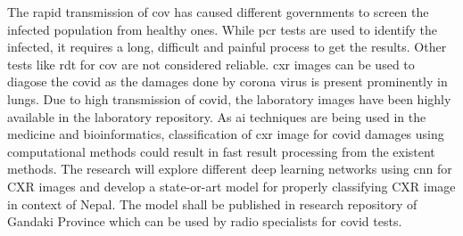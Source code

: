 The rapid transmission of \acrlong{cov} has caused different governments to screen the infected population from healthy ones. While \acrfull{pcr} tests are used to identify the infected, it requires a long, difficult and painful process to get the results. Other tests like \acrfull{rdt} for \acrlong{cov} are not considered reliable. 
\acrfull{cxr} images can be used to diagose the \acrlong{covid} as the damages done by corona virus is present prominently in lungs.
Due to high transmission of \acrshort{covid}, the laboratory images have been highly available in the laboratory repository.
As \acrfull{ai} techniques are being used in the medicine and bioinformatics, classification of \acrshort{cxr} image for \acrshort{covid} damages using computational methods could result in fast result processing from the existent methods.
The research will explore different deep learning networks using \acrshort{cnn} for CXR images and develop a state-or-art model for properly classifying CXR image in context of Nepal.
The model shall be published in research repository of Gandaki Province which can be used by radio specialists for \acrshort{covid} tests.